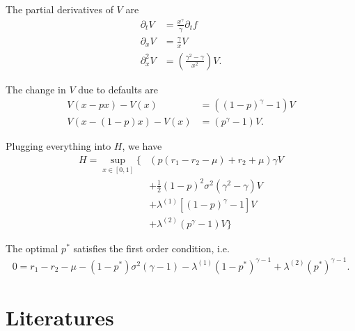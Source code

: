\documentclass[square]{article} %
\theoremstyle{plain}
\theoremstyle{definition} %
\begin{document}
The partial derivatives of $V$ are
\begin{align*}
\partial_t V &= \frac{x^\gamma}{\gamma}\partial_t f\\
\partial_x V &= \frac{\gamma}{x}V\\
\partial^2_xV &= \left(\frac{\gamma^2 - \gamma}{x^2}\right)V.
\end{align*}

The change in $V$ due to defaults are
\begin{align*}
V(x-px) - V(x)&=\left((1-p)^\gamma - 1\right) V\\
V(x-(1-p)x) - V(x) &= (p^\gamma-1) V.
\end{align*}

Plugging everything into $H$, we have
\begin{align*}
H = \sup_{x\in[0,1]}
\Big\{
&\left(p(r_1 - r_2 - \mu) + r_2 + \mu\right)\gamma V\\
&+\frac{1}{2}(1-p)^2\sigma^2 (\gamma^2-\gamma)V \\ 
&+ \lambda^{(1)}\left[(1-p)^\gamma - 1 \right]V\\
&+ \lambda^{(2)}(p^\gamma -1)V
\Big\}
\end{align*}

The optimal $p^*$ satisfies the first order condition, i.e.
\begin{align*}
0=r_1-r_2 - \mu - (1-p^*)\sigma^2 (\gamma - 1) - \lambda^{(1)}(1-p^*)^{\gamma-1} + \lambda^{(2)}(p^*)^{\gamma-1}.
\end{align*}









\section{Literatures}
\end{document}

